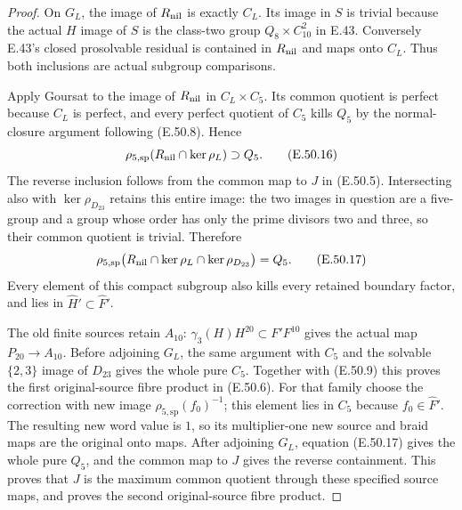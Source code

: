 \begin{proof}
On $G_L$, the image of $R_{\rm nil}$ is exactly
$C_L$.  Its image in $S$ is trivial because
the actual $H$ image of $S$ is the class-two
group $Q_8\times C_{10}^2$ in E.43.
Conversely E.43's closed prosolvable residual
is contained in $R_{\rm nil}$ and maps onto
$C_L$.  Thus both inclusions are actual
subgroup comparisons.

Apply Goursat to the image of $R_{\rm nil}$
in $C_L\times C_5$.  Its common quotient is
perfect because $C_L$ is perfect, and every
perfect quotient of $C_5$ kills $Q_5$ by the
normal-closure argument following
\textup{(E.50.8)}.  Hence
\[
 \rho_{5,\mathrm{sp}}
       (R_{\rm nil}\cap\ker\rho_L)\supset Q_5.
 \tag{E.50.16}
\]
The reverse inclusion follows from the common
map to $J$ in \textup{(E.50.5)}.  Intersecting
also with $\ker\rho_{D_{23}}$ retains this
entire image: the two images in question are
a five-group and a group whose order has
only the prime divisors two and three, so
their common quotient is trivial.  Therefore
\[
 \rho_{5,\mathrm{sp}}
 \bigl(R_{\rm nil}\cap\ker\rho_L
                     \cap\ker\rho_{D_{23}}\bigr)=Q_5.
 \tag{E.50.17}
\]
Every element of this compact subgroup also
kills every retained boundary factor, and
lies in $\widehat H'\subset\widehat F'$.

The old finite sources retain $A_{10}$:
$\gamma_3(H)H^{20}\subset F'F^{10}$ gives
the actual map $P_{20}\to A_{10}$.
Before adjoining $G_L$, the same argument
with $C_5$ and the solvable $\{2,3\}$ image
of $D_{23}$ gives the whole pure $C_5$.
Together with \textup{(E.50.9)} this proves
the first original-source fibre product in
\textup{(E.50.6)}.
For that family choose the correction with
new image $\rho_{5,\mathrm{sp}}(f_0)^{-1}$;
this element lies in $C_5$ because
$f_0\in\widehat F'$.
The resulting new word value is $1$, so
its multiplier-one new source and braid
maps are the original onto maps.
After adjoining $G_L$, equation
\textup{(E.50.17)} gives the whole pure
$Q_5$, and the common map to $J$ gives
the reverse containment.  This proves that
$J$ is the maximum common quotient through
these specified source maps, and proves
the second original-source fibre product.


\end{proof}
